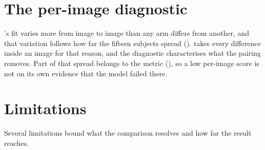 \section{The per-image diagnostic}
\label{sec:disc-per-image}

\dg{}'s fit varies more from image to image than any arm differs from another, and that variation
follows how far the fifteen subjects spread ().  takes every difference inside an image for that
reason, and the diagnostic characterises what the pairing removes. Part of that spread belongs to the
metric (), so a low per-image score is not on its own evidence that the model
failed there.

\section{Limitations}
\label{sec:disc-limits}

Several limitations bound what the comparison resolves and how far the result reaches.


